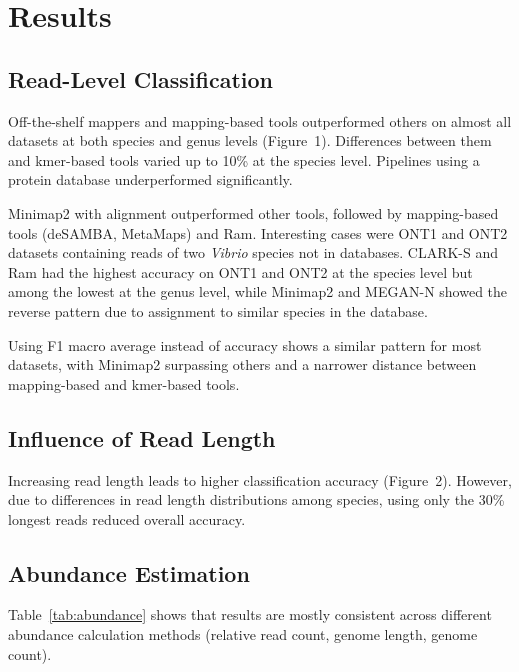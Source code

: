 \documentclass{article}
\begin{document}
\section{Results}

\subsection{Read-Level Classification}

Off-the-shelf mappers and mapping-based tools outperformed others on almost all datasets at both species and genus levels (Figure~1). Differences between them and kmer-based tools varied up to 10\% at the species level. Pipelines using a protein database underperformed significantly.

Minimap2 with alignment outperformed other tools, followed by mapping-based tools (deSAMBA, MetaMaps) and Ram. Interesting cases were ONT1 and ONT2 datasets containing reads of two \textit{Vibrio} species not in databases. CLARK-S and Ram had the highest accuracy on ONT1 and ONT2 at the species level but among the lowest at the genus level, while Minimap2 and MEGAN-N showed the reverse pattern due to assignment to similar species in the database.

Using F1 macro average instead of accuracy shows a similar pattern for most datasets, with Minimap2 surpassing others and a narrower distance between mapping-based and kmer-based tools.

\subsection{Influence of Read Length}

Increasing read length leads to higher classification accuracy (Figure~2). However, due to differences in read length distributions among species, using only the 30\% longest reads reduced overall accuracy.

\subsection{Abundance Estimation}

Table~\ref{tab:abundance} shows that results are mostly consistent across different abundance calculation methods (relative read count, genome length, genome count).
\end{document}
